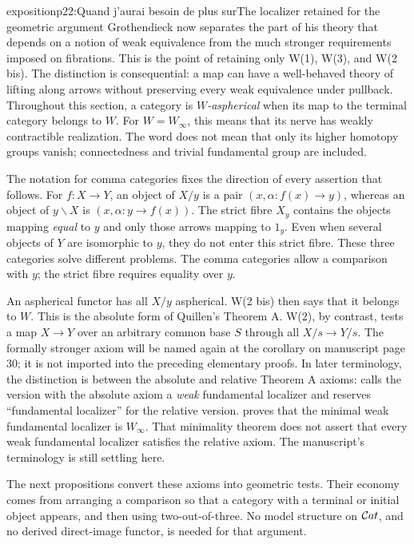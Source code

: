 \begin{dcomment}{exposition}{p22:Quand j'aurai besoin de plus sur}{The localizer retained for the geometric argument}
Grothendieck now separates the part of his theory that depends on a notion of weak equivalence from the much stronger requirements imposed on fibrations. This is the point of retaining only W(1), W(3), and W(2 bis). The distinction is consequential: a map can have a well-behaved theory of lifting along arrows without preserving every weak equivalence under pullback. Throughout this section, a category is \emph{$W$-aspherical} when its map to the terminal category belongs to $W$. For $W=W_\infty$, this means that its nerve has weakly contractible realization. The word does not mean that only its higher homotopy groups vanish; connectedness and trivial fundamental group are included.

The notation for comma categories fixes the direction of every assertion that follows. For $f:X\to Y$, an object of $X/y$ is a pair $(x,\alpha:f(x)\to y)$, whereas an object of $y\backslash X$ is $(x,\alpha:y\to f(x))$. The strict fibre $X_y$ contains the objects mapping \emph{equal} to $y$ and only those arrows mapping to $1_y$. Even when several objects of $Y$ are isomorphic to $y$, they do not enter this strict fibre. These three categories solve different problems. The comma categories allow a comparison with $y$; the strict fibre requires equality over $y$.

An aspherical functor has all $X/y$ aspherical. W(2 bis) then says that it belongs to $W$. This is the absolute form of Quillen's Theorem A. W(2), by contrast, tests a map $X\to Y$ over an arbitrary common base $S$ through all $X/s\to Y/s$. The formally stronger axiom will be named again at the corollary on manuscript page 30; it is not imported into the preceding elementary proofs. In later terminology, the distinction is between the absolute and relative Theorem A axioms: \citet[\S1.1]{Maltsiniotis2012Exact} calls the version with the absolute axiom a \emph{weak} fundamental localizer and reserves ``fundamental localizer'' for the relative version. \citet[Theorem 6.1.18]{Cisinski2006} proves that the minimal weak fundamental localizer is $W_\infty$. That minimality theorem does not assert that every weak fundamental localizer satisfies the relative axiom. The manuscript's terminology is still settling here.

The next propositions convert these axioms into geometric tests. Their economy comes from arranging a comparison so that a category with a terminal or initial object appears, and then using two-out-of-three. No model structure on $\mathcal{C}at$, and no derived direct-image functor, is needed for that argument.
\end{dcomment}


